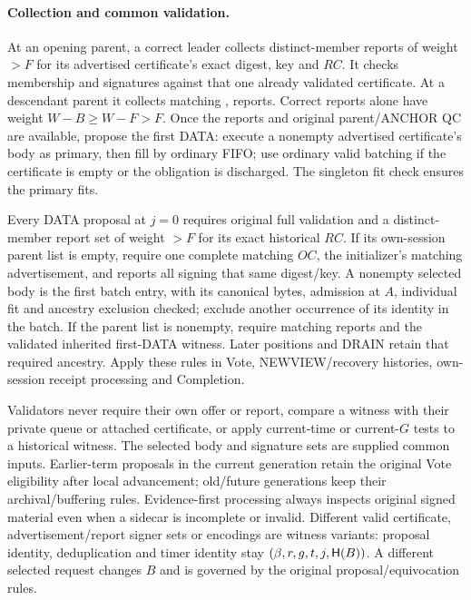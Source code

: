 \paragraph{Collection and common validation.}
At an opening parent, a correct leader collects distinct-member reports
of weight $>F$ for its advertised certificate's exact digest, key and
$\mathit{RC}$. It checks membership and signatures against that one
already validated certificate. At a descendant parent it collects
matching ,  reports. Correct reports alone
have weight $W-B\ge W-F>F$. Once the reports and original parent/ANCHOR
QC are available, propose the first DATA: execute a nonempty advertised
certificate's body as primary, then fill by ordinary FIFO; use ordinary
valid batching if the certificate is empty or the obligation is
discharged. The singleton fit check ensures the primary fits.

Every DATA proposal at $j=0$ requires original full validation and a
distinct-member report set of weight $>F$ for its exact historical
$\mathit{RC}$. If its own-session parent list is empty, require one
complete matching $\mathit{OC}$, the initializer's matching advertisement,
and reports all signing that same  digest/key. A nonempty
selected body is the first batch entry, with its canonical bytes,
admission at $A$, individual fit and ancestry exclusion checked; exclude
another occurrence of its identity in the batch. If the parent list is
nonempty, require matching  reports and the validated
inherited first-DATA witness. Later positions and DRAIN retain that
required ancestry. Apply these rules in Vote, NEWVIEW/recovery histories,
own-session receipt processing and Completion.

Validators never require their own offer or report, compare a witness
with their private queue or attached certificate, or apply current-time
or current-$G$ tests to a historical witness. The selected body and
signature sets are supplied common inputs. Earlier-term proposals in
the current generation retain the original Vote eligibility after local
advancement; old/future generations keep their archival/buffering rules.
Evidence-first processing always inspects original signed material even
when a sidecar is incomplete or invalid. Different valid certificate,
advertisement/report signer sets or encodings are witness variants:
proposal identity, deduplication and timer identity stay
$(\beta,r,g,t,j,\mathsf H(B))$. A different selected request changes $B$ and
is governed by the original proposal/equivocation rules.

